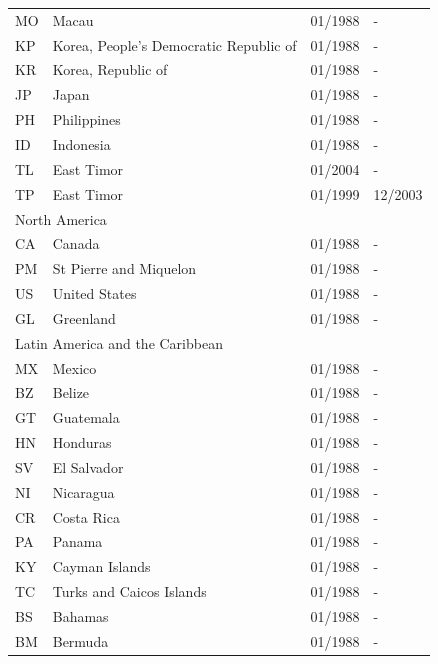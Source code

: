 \begin{scriptsize}
\begin{longtable}{lp{8cm}p{2cm}p{2cm}}
	MO & Macau                                  & 01/1988 & -  \\
	KP & Korea, People's Democratic Republic of & 01/1988 & -  \\
	KR & Korea, Republic of                     & 01/1988 & -  \\
	JP & Japan                                  & 01/1988 & -  \\
	PH & Philippines                            & 01/1988 & -  \\
	ID & Indonesia                              & 01/1988 & -  \\
	TL & East Timor                             & 01/2004 & -  \\
	TP & East Timor                             & 01/1999 & 12/2003  \\
	\midrule
	\multicolumn{3}{l}{North America}  &  \\
	CA & Canada                 & 01/1988 & -  \\
	PM & St Pierre and Miquelon & 01/1988 & -  \\
	US & United States          & 01/1988 & -  \\
	GL & Greenland              & 01/1988 & -  \\
	\midrule
	\multicolumn{3}{l}{Latin America and the Caribbean}  &  \\
	MX & Mexico                                   & 01/1988 & -  \\
	BZ & Belize                                   & 01/1988 & -  \\
	GT & Guatemala                                & 01/1988 & -  \\
	HN & Honduras                                 & 01/1988 & -  \\
	SV & El Salvador                              & 01/1988 & -  \\
	NI & Nicaragua                                & 01/1988 & -  \\
	CR & Costa Rica                               & 01/1988 & -  \\
	PA & Panama                                   & 01/1988 & -  \\
	KY & Cayman Islands                           & 01/1988 & -  \\
	TC & Turks and Caicos Islands                 & 01/1988 & -  \\
	BS & Bahamas                                  & 01/1988 & -  \\
	BM & Bermuda                                  & 01/1988 & -  \\

\end{longtable}
\end{scriptsize}
